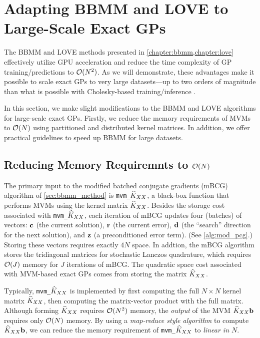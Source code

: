\section{Adapting BBMM and LOVE to Large-Scale Exact GPs}
\label{sec:largeexact_method}

The BBMM and LOVE methods presented in \cref{chapter:bbmm,chapter:love} effectively utilize GPU acceleration and reduce the time complexity of GP training/predictions to $\bigo{N^2}$.
As we will demonstrate, these advantages make it possible to scale exact GPs to very large datasets---up to two orders of magnitude than what is possible with Cholesky-based training/inference \cite{nguyen2019exact}.

In this section, we make slight modifications to the BBMM and LOVE algorithms for large-scale exact GPs.
Firstly, we reduce the memory requirements of MVMs to $\bigo{N}$ using partitioned and distributed kernel matrices.
In addition, we offer practical guidelines to speed up BBMM for large datasets.




\subsection{Reducing Memory Requiremnts to $\bigo{N}$}

The primary input to the modified batched conjugate gradients (mBCG) algorithm of \cref{sec:bbmm_method} is {\tt mvm\_$\widehat{K}_{XX}$}, a black-box function that performs MVMs using the kernel matrix $\widehat{K}_{XX}$.
Besides the storage cost associated with {\tt mvm\_$\widehat{K}_{XX}$}, each iteration of mBCG updates four (batches) of vectors: $\mathbf{c}$ (the current solution), $\mathbf{r}$ (the current error), $\mathbf{d}$ (the ``search'' direction for the next solution), and $\mathbf{z}$ (a preconditioned error term).
(See \cref{alg:mod_pcg}.)
Storing these vectors requires exactly $4N$ space.
In addtion, the mBCG algorithm stores the tridiagonal matrices for stochastic Lanczos quadrature, which requires $\bigo{J}$ memory for $J$ iterations of mBCG.
The quadratic space cost associated with MVM-based exact GPs comes from storing the matrix $\widehat{K}_{XX}$.

Typically, {\tt mvm\_$\widehat{K}_{XX}$} is implemented by first computing the full $N \times N$ kernel matrix $\widehat{K}_{XX}$, then computing the matrix-vector product with the full matrix.
Although forming $\widehat{K}_{XX}$ requires $\bigo{N^2}$ memory, the \emph{output} of the MVM $\widehat{K}_{XX} \mathbf{b}$ requires only $\bigo{N}$ memory.
By using a \emph{map-reduce style algorithm} to compute $\widehat{K}_{XX} \mathbf{b}$, we can reduce the memory requirement of {\tt mvm\_$\widehat{K}_{XX}$} to \emph{linear in $N$}.

